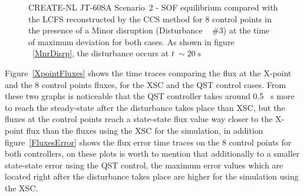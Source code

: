 \begin{figure}[h]
	
	\caption{  CREATE-NL JT-60SA Scenario~2 - SOF equilibrium compared with the LCFS reconstructed by the CCS method for 8 control points in the presence of a Minor disruption (Disturbance ~ $\#3$) at the time of maximum deviation for both cases. As shown in figure ~\ref{MnrDisrp}, the disturbance occurs at $t~\sim 20 ~ s$  \label{20secs}}
\end{figure}



Figure~\ref{XpointFluxes} shows the time traces comparing the flux at the X-point and the 8 control points fluxes, for the XSC and the QST control cases. From these two graphs is noticeable that the QST controller takes around 0.5 ~s  more to reach the steady-state after the disturbance takes place than XSC, but the fluxes at the control points reach a state-state flux value way closer to the X-point flux than the fluxes using the  XSC for the simulation, in addition figure~\ref{FluxesError} shows the flux error time traces on the 8 control points for both controllers, on these plots is worth to mention that additionally to a smaller state-state error using the QST control, the maximum error values which are located right after the disturbance takes place are higher for the simulation using the XSC. 
\smallskip




